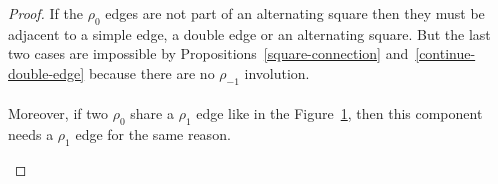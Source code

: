\begin{proof}
  If the $\rho_0$ edges are not part of an alternating square then they must be adjacent to a simple edge, a double edge or an alternating square. But the last two cases are impossible by Propositions~\ref{square-connection} and~\ref{continue-double-edge} because there are no $\rho_{-1}$ involution.

  \paragraph{}
  Moreover, if two $\rho_0$ share a $\rho_1$ edge like in the Figure~\ref{rho0Fig}, then this component needs a $\rho_1$ edge for the same reason.

  \begin{figure}[H]
    \begin{center}
      \caption{}
      \label{rho0Fig}
    \end{center}
  \end{figure}
\end{proof}
